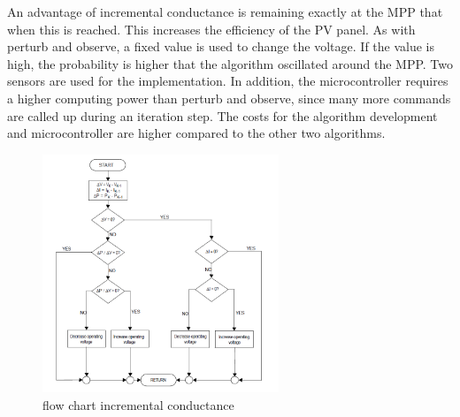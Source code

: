 An advantage of incremental conductance is remaining exactly at the MPP that when this is reached. This increases the efficiency of the PV panel. As with perturb and observe, a fixed value is used to change the voltage. If the value is high, the probability is higher that the algorithm oscillated around the MPP. 
Two sensors are used for the implementation. In addition, the microcontroller requires a higher computing power than perturb and observe, since many more commands are called up during an iteration step. The costs for the algorithm development and microcontroller are higher compared to the other two algorithms\cite{AN1521_MC}.
\begin{figure}[H]
	\begin{center}
		\includegraphics[width=0.63\textwidth]{../Pictures/P1/Flow_chart/flow_chart_incremental_conductance}
		\caption{flow chart incremental conductance \cite{AN1521_MC} }
		\label{fcinccon}
	\end{center}	
\end{figure}

%



